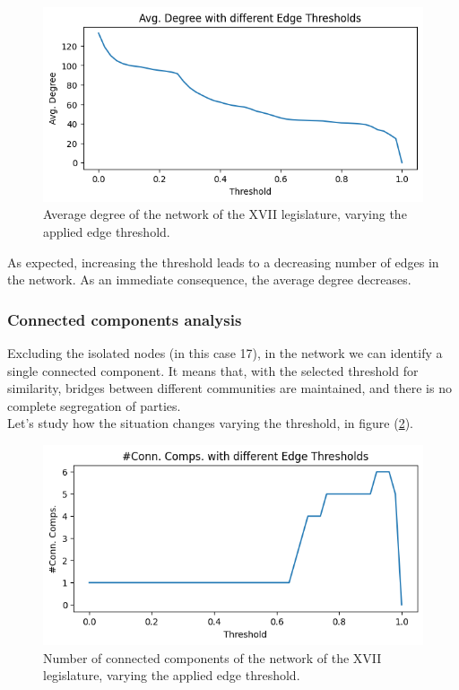 \begin{figure}[h]
  \centering
  \includegraphics[width=\linewidth]{img/degree_xvii_varing_tresh.png}
  \caption{Average degree of the network of the XVII legislature, varying the applied edge threshold.}
  \label{fig:degree_thresh}
\end{figure}

As expected, increasing the threshold leads to a decreasing number of edges in the network. As an immediate consequence, the average degree decreases.

\subsubsection{Connected components analysis}

Excluding the isolated nodes (in this case 17), in the network we can identify a single connected component. It means that, with the selected threshold for similarity, bridges between different communities are maintained, and there is no complete segregation of parties.\\
Let's study how the situation changes varying the threshold, in figure (\ref{fig:conn_comps_thresh}).

\begin{figure}[h]
  \centering
  \includegraphics[width=\linewidth]{img/conn_comps_changing_thresh.png}
  \caption{Number of connected components of the network of the XVII legislature, varying the applied edge threshold.}
  \label{fig:conn_comps_thresh}
\end{figure}

